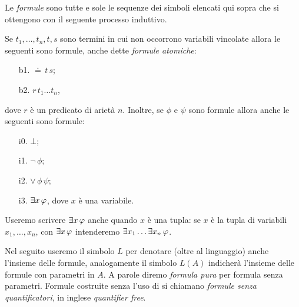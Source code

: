 \begin{definition}\label{defformule} Le \emph{formule\/} sono tutte e sole le sequenze dei simboli elencati qui sopra che si ottengono con il seguente processo induttivo.

Se $t_1,\dots,t_n, t, s$ sono termini in cui non occorrono variabili vincolate allora le seguenti sono formule, anche dette \emph{formule atomiche}:

\begin{minipage}[t]{.499\textwidth}
\begin{itemize} 
\item[b1.]  ${\doteq}\,t\,s$;
\end{itemize}
\end{minipage}
\begin{minipage}[t]{.499\textwidth}
\begin{itemize}
\item[b2.] $r\,t_1\dots t_n$,
\end{itemize}
\end{minipage}

dove $r$ \`e un predicato di ariet\`a $n$. Inoltre, se $\phi$ e $\psi$ sono formule allora anche le seguenti sono formule:

\begin{minipage}[t]{.499\textwidth}
\begin{itemize} 
\item[i0.] $\bot$;
\item[i1.] ${\neg}\,\phi$;
\end{itemize}
\end{minipage}
\begin{minipage}[t]{.499\textwidth}
\begin{itemize}
\item[i2.] ${\vee}\,\phi\,\psi$;
\item[i3.] $\exists x\,\varphi$, dove $x$ \`e una variabile.\QED
\end{itemize}
\end{minipage}
\end{definition}

Useremo scrivere $\exists x\,\varphi$ anche quando $x$ \`e una tupla: se $x$ \`e la tupla di variabili $x_1,\dots,x_n$, con $\exists x\,\varphi$ intenderemo $\exists x_1\dots\exists x_n\,\varphi$.

Nel seguito useremo il simbolo $L$ per denotare (oltre al linguaggio) anche l'insieme delle formule, analogamente il simbolo $L(A)$ indicher\`a l'insieme delle formule con parametri in $A$. A parole diremo \emph{formula pura\/} per formula senza parametri. Formule costruite senza l'uso di  si chiamano \emph{formule senza quantificatori}, in inglese \emph{quantifier free}. %

